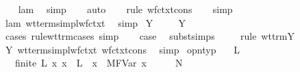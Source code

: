 \begin{isabellebody}
\ \ \isamarkupfalse%
\ lam\ \isamarkupfalse%
\ simp\isanewline
\ \ \isamarkupfalse%
\ auto{\isacharbrackleft}{}{\isacharbrackright}\isanewline
\ \ \isamarkupfalse%
\ {\isacharparenleft}rule\ wf{\isacharunderscore}ctxt{\isachardot}cons{\isacharparenright}\isanewline
\ \ \isamarkupfalse%
\ simp\isanewline
\ \ \isamarkupfalse%
\ lam\ wt{\isacharunderscore}terms{\isacharunderscore}impl{\isacharunderscore}wf{\isacharunderscore}ctxt\ \isamarkupfalse%
\ simp\isanewline
{}\isamarkupfalse%
\isanewline
{}\isamarkupfalse%
\ {\isacharparenleft}Y\ {\isasymgamma}{\isacharparenright}\isanewline
\ \ \isamarkupfalse%
\ Y{\isacharparenleft}{}{\isacharparenright}\ \isamarkupfalse%
\ {}{\isacharcolon}\ {\isachardoublequoteopen}{\isasymsigma}\ {\isacharequal}\ {\isacharparenleft}{\isasymgamma}\ {\isasymrightarrow}\ {\isasymgamma}{\isacharparenright}\ {\isasymrightarrow}\ {\isasymgamma}{\isachardoublequoteclose}\ \isamarkupfalse%
\ {\isacharparenleft}cases\ rule{\isacharcolon}wt{\isacharunderscore}trm{\isachardot}cases{\isacharcomma}\ simp{\isacharparenright}\isanewline
\ \ \isamarkupfalse%
\ {\isacharquery}case\ \isamarkupfalse%
\ subst{\isachardot}simps\ {}\isanewline
\ \ \isamarkupfalse%
\ {\isacharparenleft}rule\ wt{\isacharunderscore}trm{\isachardot}Y{\isacharparenright}\isanewline
\ \ \isamarkupfalse%
\ Y\ wt{\isacharunderscore}terms{\isacharunderscore}impl{\isacharunderscore}wf{\isacharunderscore}ctxt\ wf{\isacharunderscore}ctxt{\isacharunderscore}cons\ \isamarkupfalse%
\ simp\isanewline
{}\isamarkupfalse%
%
\endisatagproof
{\isafoldproof}%
%
\isadelimproof
\isanewline
%
\endisadelimproof
\isanewline
{}\isamarkupfalse%
\ opn{\isacharunderscore}typ{\isacharcolon}\isanewline
\ \ \ L\isanewline
\ \ \ {\isachardoublequoteopen}finite\ L{\isachardoublequoteclose}\ {\isachardoublequoteopen}{\isasymAnd}x{\isachardot}\ x\ {\isasymnotin}\ L\ {\isasymLongrightarrow}\ {\isacharparenleft}{\isacharparenleft}x{\isacharcomma}{\isasymtau}{\isacharparenright}{\isacharhash}{\isasymGamma}{\isacharparenright}\ {\isasymturnstile}\ M{\isacharcircum}FVar\ x\ {\isacharcolon}\ {\isasymsigma}{\isachardoublequoteclose}\ \ {\isachardoublequoteopen}{\isasymGamma}\ {\isasymturnstile}\ N\ {\isacharcolon}\ {\isasymtau}{\isachardoublequoteclose}\isanewline

\end{isabellebody}
